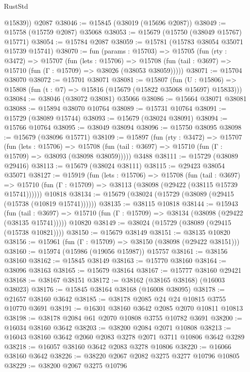 \begin{lexlean}{RustStd}
\begin{coremodule}
        @15839))
    @2087
@38046 := @15845 (@38019 (@15696 @2087))
@38049 := @15758 (@15759 @2087) @35068
@38053 := @15679 (@15750 (@38049 @15767) @15771)
@38054 := @15784 @2087
@38059 := @15781 (@15783 @38054 @35071 @15739 @15741)
@38070 := fun (params : @15703) =>
  @15705
    (fun (rty : @3472) =>
    @15707
      (fun (lets : @15706) =>
      @15708 (fun (tail : @3697) => @15710 (fun (Γ : @15709) => @38026 (@38053 @38059)))))
@38071 := @15704 @38070
@38072 := @15701 @38071
@38081 := @15807
    (fun (U : @15806) => @15808 (fun (t : @7) => @15816 (@15679 (@15822 @35068 @15697) @15833)))
@38084 := @38046 (@38072 @38081) @35066
@38086 := @15664 @38071 @38081
@38088 := @15894 @38070 @10764
@38089 := @15731 @10764
@38091 := @15729 (@38089 @15744)
@38093 := @15679 (@38024 @38091)
@38094 := @15766 @10764
@38095 := @38049 @38094
@38096 := @15750 @38095
@38098 := @15679 (@38096 @15771)
@38109 := @15897
    (fun (rty : @3472) =>
    @15707
      (fun (lets : @15706) =>
      @15708 (fun (tail : @3697) => @15710 (fun (Γ : @15709) => @38093 (@38098 @38059)))))
    @3488
@38111 := @15729 (@38089 @29416)
@38113 := @15679 (@38024 @38111)
@38115 := @29423 @38054 @35071
@38127 := @15919
    (fun (lets : @15706) =>
    @15708
      (fun (tail : @3697) =>
      @15710 (fun (Γ : @15709) => @38113 (@38098 (@29422 (@38115 @15739 @15741))))))
    @10818
@38134 := @15679 (@38024 (@15729 (@38089 (@29415 (@15738 (@10819 @15741))))))
@38135 := @38115 @10818
@38144 := @15943
    (fun (tail : @3697) => @15710 (fun (Γ : @15709) => @38134 (@38098 (@29422 (@38135 @15741)))))
    @10820
@38149 := @38024 (@15729 (@38089 (@29415 (@15738 @10821))))
@38150 := @15679 @38149
@38151 := @38135 @10820
@38156 := @15961 (fun (Γ : @15709) => @38150 (@38098 (@29422 @38151)))
@38160 := @15974 (@15986 (@19056 @15987)) @15757
@38161 := @38156 @38160
@38162 := @15845 @38149
@38163 := @15770 @38160
@38164 := @38096 @38163
@38165 := @15679 @38164
@38167 := @15777 @38160 @29421
@38168 := @38167 @38151
@38172 := @38162 (@38165 @38168) (@16003 @38023)
@38176 := @15845 @38164 @38168 (@16008 @38095)
@38178 := @21657 @38160 @3642
@38185 := @38178 @2085 @24 @24 @10815 @3755 @10770 @3691
@38191 := @16301 @38160 @3642 @2085 @2070 @10811 @10813
@38198 := @38178 @2084 @61 @2070 @10808 @3755 @10782 @3691
@38200 := @16034 @38160 @3642
@38203 := @38200 @2084 @2071 @10808
@38213 := @16043 @38160 @3642 @2060 @2083 @3278 @2071 @3711 @10806 @3642 @3289
@38218 := @16057 @38160 @3642 @2083 @3278 @10806
@38220 := @16066 @38160 @3642
@38226 := @38220 @2067 @2082 @3275 @3277 @10796 @10805
@38229 := @38200 @2067 @3275 @10796

\end{coremodule}
\end{lexlean}

